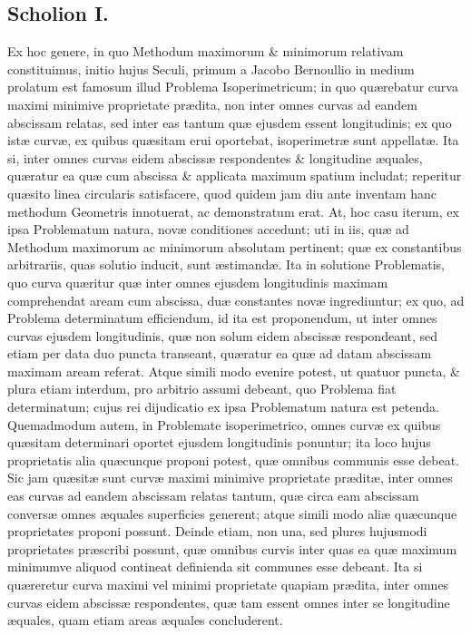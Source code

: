\subsection*{Scholion I.}
Ex hoc genere, in quo Methodum maximorum \& minimorum
relativam constituimus, initio hujus Seculi, primum a Jacobo Bernoullio in
medium prolatum est famosum illud Problema Isoperimetricum; in quo
quærebatur curva maximi minimive proprietate prædita, non inter omnes
curvas ad eandem abscissam relatas, sed inter eas tantum quæ ejusdem
essent longitudinis; ex quo istæ curvæ, ex quibus quæsitam erui oportebat,
isoperimetræ sunt appellatæ. Ita si, inter omnes curvas eidem abscissæ
respondentes \& longitudine æquales, quæratur ea quæ cum abscissa \& applicata
maximum spatium includat; reperitur quæsito linea circularis satisfacere,
quod quidem jam diu ante inventam hanc methodum Geometris innotuerat, ac
demonstratum erat. At, hoc casu iterum, ex ipsa Problematum natura, novæ
conditiones accedunt; uti in iis, quæ ad Methodum maximorum ac minimorum
absolutam pertinent;  quæ ex constantibus arbitrariis, quas solutio inducit,
sunt æstimandæ. Ita in solutione Problematis, quo curva quæritur quæ inter
omnes ejusdem longitudinis maximam comprehendat aream cum abscissa, duæ
constantes novæ ingrediuntur; ex quo, ad Problema determinatum efficiendum,
id ita est proponendum, ut inter omnes curvas ejusdem longitudinis, quæ non
solum eidem abscissæ respondeant, sed etiam per data duo puncta transeant,
quæratur ea quæ ad datam abscissam maximam aream referat. Atque simili
modo evenire potest, ut quatuor puncta, \& plura etiam interdum, pro arbitrio
assumi debeant, quo Problema fiat determinatum; cujus rei dijudicatio ex
ipsa Problematum natura est petenda. Quemadmodum autem, in Problemate
isoperimetrico, omnes curvæ ex quibus quæsitam determinari oportet ejusdem
longitudinis ponuntur; ita loco hujus proprietatis alia quæcunque proponi
potest, quæ omnibus communis esse debeat. Sic jam quæsitæ sunt curvæ maximi
minimive proprietate præditæ, inter omnes eas curvas ad eandem abscissam
relatas tantum, quæ circa eam abscissam conversæ omnes æquales superficies
generent; atque simili modo aliæ quæcunque proprietates proponi possunt.
Deinde etiam, non una, sed plures hujusmodi proprietates præscribi possunt,
quæ omnibus curvis inter quas ea quæ maximum minimumve aliquod contineat
definienda sit communes esse debeant. Ita si quæreretur curva maximi vel
minimi proprietate quapiam prædita, inter omnes curvas eidem abscissæ
respondentes, quæ tam essent omnes inter se longitudine æquales, quam etiam
areas æquales concluderent.

